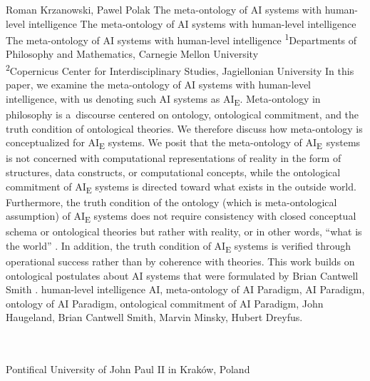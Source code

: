 \begin{artengenv2auth}{Roman Krzanowski, Pawel Polak}
	{The meta-ontology of AI systems with human-level intelligence}
	{The meta-ontology of AI systems with human-level intelligence}
	{The meta-ontology of AI systems with human-level intelligence}
	{\textsuperscript{1}Departments of Philosophy and Mathematics, Carnegie Mellon University\\
		\textsuperscript{2}Copernicus Center for Interdisciplinary Studies, Jagiellonian University}
	{\label{krzanowpolak_start}In this paper, we examine the meta-ontology of AI systems with human-level intelligence, with us denoting such AI systems as AI\textsubscript{E}. Meta-ontology in philosophy is a~discourse centered on ontology, ontological commitment, and the truth condition of ontological theories. We therefore discuss how meta-ontology is conceptualized for AI\textsubscript{E} systems. We posit that the meta-ontology of AI\textsubscript{E~}systems is not concerned with computational representations of reality in the form of structures, data constructs, or computational concepts, while the ontological commitment of AI\textsubscript{E} systems is directed toward what exists in the outside world. Furthermore, the truth condition of the ontology (which is meta-ontological assumption) of AI\textsubscript{E} systems does not require consistency with closed conceptual schema or ontological theories but rather with reality, or in other words, ``what is the world''
	\parencite[][p.57]{smith_promise_2019}. %
	 In addition, the truth condition of AI\textsubscript{E} systems is verified through operational success rather than by coherence with theories. This work builds on ontological postulates about AI systems that were formulated by Brian Cantwell Smith 
	\parencite*[][]{smith_promise_2019}.%
	}
	{human-level intelligence AI, meta-ontology of AI Paradigm, AI Paradigm, ontology of AI Paradigm, ontological commitment of AI Paradigm, John Haugeland, Brian Cantwell Smith, Marvin Minsky, Hubert Dreyfus.}
	{%
		{\flushright{}\\\\\subsubsectit\small{Pontifical University of John Paul II in Kraków, Poland}\par}%
	}




\end{artengenv2auth}
